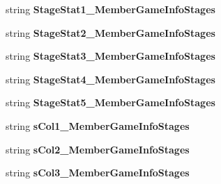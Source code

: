 \begin{DoxyCompactItemize}
\item 
string {\bfseries Stage\+Stat1\+\_\+\+Member\+Game\+Info\+Stages}\hypertarget{a00111_aec3b0494b497feb4d744d84d8816594f}{}\label{a00111_aec3b0494b497feb4d744d84d8816594f}

\item 
string {\bfseries Stage\+Stat2\+\_\+\+Member\+Game\+Info\+Stages}\hypertarget{a00111_a1906c664ee5003aa4f314d8bb8ee51c5}{}\label{a00111_a1906c664ee5003aa4f314d8bb8ee51c5}

\item 
string {\bfseries Stage\+Stat3\+\_\+\+Member\+Game\+Info\+Stages}\hypertarget{a00111_aa4869ec0b10006789f144749a017e6f0}{}\label{a00111_aa4869ec0b10006789f144749a017e6f0}

\item 
string {\bfseries Stage\+Stat4\+\_\+\+Member\+Game\+Info\+Stages}\hypertarget{a00111_a30c095883e516c1347907e20cd209c0e}{}\label{a00111_a30c095883e516c1347907e20cd209c0e}

\item 
string {\bfseries Stage\+Stat5\+\_\+\+Member\+Game\+Info\+Stages}\hypertarget{a00111_ac889e25528a495184e789848ef1efd0d}{}\label{a00111_ac889e25528a495184e789848ef1efd0d}

\item 
string {\bfseries s\+Col1\+\_\+\+Member\+Game\+Info\+Stages}\hypertarget{a00111_abe28e02230ea4f804ce18c3ea32b5bbf}{}\label{a00111_abe28e02230ea4f804ce18c3ea32b5bbf}

\item 
string {\bfseries s\+Col2\+\_\+\+Member\+Game\+Info\+Stages}\hypertarget{a00111_ae828cca24223c9913f7b3ceb4aa000b7}{}\label{a00111_ae828cca24223c9913f7b3ceb4aa000b7}

\item 
string {\bfseries s\+Col3\+\_\+\+Member\+Game\+Info\+Stages}\hypertarget{a00111_a75e78951368a68ac9a5cd6c5fc170933}{}\label{a00111_a75e78951368a68ac9a5cd6c5fc170933}


\end{DoxyCompactItemize}
